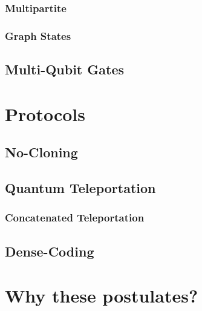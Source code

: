             \subsubsection{Multipartite} %

            \subsubsection{Graph States} %

        \subsection{Multi-Qubit Gates} %

    \section{Protocols} %

        \subsection{No-Cloning} %

        \subsection{Quantum Teleportation} %

            \subsubsection{Concatenated Teleportation} %

        \subsection{Dense-Coding} %

    \section{Why these postulates?} %

